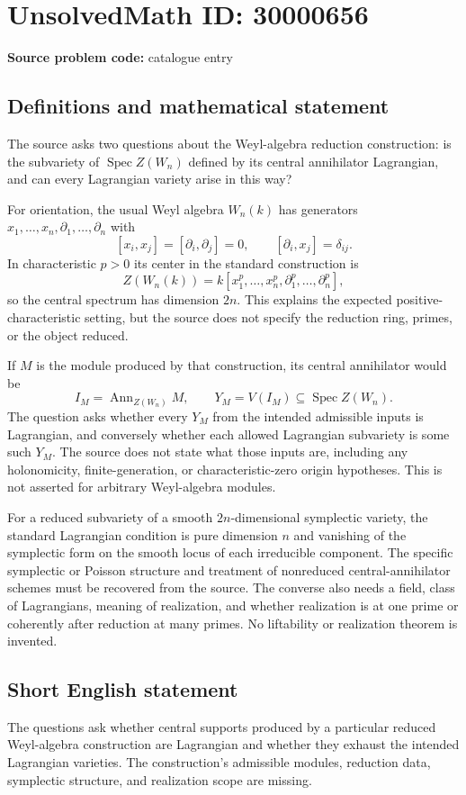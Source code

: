 \documentclass[11pt]{article}
\begin{document}
\section*{UnsolvedMath ID: 30000656}
\textbf{Source problem code:} catalogue entry
\subsection{Definitions and mathematical statement}
The source asks two questions about the Weyl-algebra reduction construction: is the subvariety of $\operatorname{Spec}Z(W_n)$ defined by its central annihilator Lagrangian, and can every Lagrangian variety arise in this way?

For orientation, the usual Weyl algebra $W_n(k)$ has generators $x_1,\ldots,x_n,\partial_1,\ldots,\partial_n$ with
\[
 [x_i,x_j]=[\partial_i,\partial_j]=0,\qquad
 [\partial_i,x_j]=\delta_{ij}.
\]
In characteristic $p>0$ its center in the standard construction is
\[
 Z(W_n(k))=k[x_1^p,\ldots,x_n^p,\partial_1^p,\ldots,\partial_n^p],
\]
so the central spectrum has dimension $2n$. This explains the expected positive-characteristic setting, but the source does not specify the reduction ring, primes, or the object reduced.

If $M$ is the module produced by that construction, its central annihilator would be
\[
 I_M=\operatorname{Ann}_{Z(W_n)}M,
 \qquad Y_M=V(I_M)\subseteq\operatorname{Spec}Z(W_n).
\]
The question asks whether every $Y_M$ from the intended admissible inputs is Lagrangian, and conversely whether each allowed Lagrangian subvariety is some such $Y_M$. The source does not state what those inputs are, including any holonomicity, finite-generation, or characteristic-zero origin hypotheses. This is not asserted for arbitrary Weyl-algebra modules.

For a reduced subvariety of a smooth $2n$-dimensional symplectic variety, the standard Lagrangian condition is pure dimension $n$ and vanishing of the symplectic form on the smooth locus of each irreducible component. The specific symplectic or Poisson structure and treatment of nonreduced central-annihilator schemes must be recovered from the source. The converse also needs a field, class of Lagrangians, meaning of realization, and whether realization is at one prime or coherently after reduction at many primes. No liftability or realization theorem is invented.
\subsection{Short English statement}
The questions ask whether central supports produced by a particular reduced Weyl-algebra construction are Lagrangian and whether they exhaust the intended Lagrangian varieties. The construction's admissible modules, reduction data, symplectic structure, and realization scope are missing.
\end{document}
